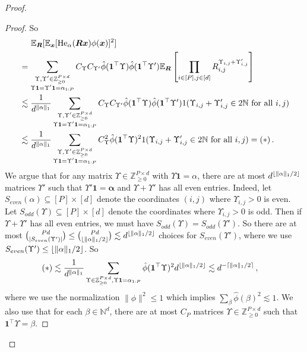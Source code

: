 \documentclass[11pt]{article}
\newcommand{\E}{\mathbb{E}}
\newcommand{\Z}{\mathbb{Z}}
\newcommand{\N}{\mathbb{N}}
\newcommand{\<}{\langle}
\renewcommand{\>}{\rangle}
\theoremstyle{definition}
\def\bR{{\boldsymbol R}}
\def\bx{{\boldsymbol x}}
\def\He{{\rm He}}
\def\bx{{\boldsymbol x}}
\def\He{{\rm He}}
\def\bR{{\boldsymbol R}}
\def\bones{{\boldsymbol 1}}
\DeclarePairedDelimiter{\ceil}{\lceil}{\rceil}
\DeclarePairedDelimiter{\floor}{\lfloor}{\rfloor}
\def\balpha{{\boldsymbol \alpha}}
\begin{document}
\begin{proof}
\begin{proof}
So
\begin{align*}
& \;\;\;\;\; \E_{\bR}[\E_{\bx}[\He_{\alpha}(\bR\bx) \phi(\bx)]^2] \\
&= \sum_{\substack{\Upsilon,\Upsilon' \in \Z_{\geq 0}^{P \times d} \\ \Upsilon \bones = \Upsilon' \bones = \alpha_{1:P}}} C_{\Upsilon} C_{\Upsilon'} \hat{\phi}(\bones^{\top} \Upsilon) \hat{\phi}(\bones^{\top} \Upsilon') \E_{\bR}\left[ \prod_{i \in [P],j \in [d]} R_{i,j}^{\Upsilon_{i,j} + \Upsilon'_{i,j}}\right] \\
&\lesssim \frac{1}{d^{\|\alpha\|_1}} \sum_{\substack{\Upsilon,\Upsilon' \in \Z_{\geq 0}^{P \times d} \\ \Upsilon \bones = \Upsilon' \bones = \alpha_{1:P}}} C_{\Upsilon} C_{\Upsilon'} \hat{\phi}(\bones^{\top} \Upsilon) \hat{\phi}(\bones^{\top} \Upsilon') 1(\Upsilon_{i,j} + \Upsilon'_{i,j} \in 2\N \mbox{ for all } i, j) \\
&\lesssim \frac{1}{d^{\|\alpha\|_1}} \sum_{\substack{\Upsilon,\Upsilon' \in \Z_{\geq 0}^{P \times d} \\ \Upsilon \bones = \Upsilon' \bones = \alpha_{1:P}}} C_{\Upsilon}^2 \hat{\phi}(\bones^{\top} \Upsilon)^2 1(\Upsilon_{i,j} + \Upsilon'_{i,j} \in 2\N \mbox{ for all } i, j) = (\ast)\,.
\end{align*}
We argue that for any matrix $\Upsilon \in \Z_{\geq 0}^{P \times d}$ with $\Upsilon \bones = \alpha$, there are at most $d^{\floor{\|\alpha\|_1/2}}$ matrices $\Upsilon'$ such that $\Upsilon' \bones = \balpha$ and $\Upsilon + \Upsilon'$ has all even entries. Indeed, let $S_{even}(\alpha) \subseteq [P] \times [d]$ denote the coordinates $(i,j)$ where $\Upsilon_{i,j} > 0$ is even. Let $S_{odd}(\Upsilon) \subseteq [P] \times [d]$ denote the coordinates where $\Upsilon_{i,j} > 0$ is odd. Then if $\Upsilon + \Upsilon'$ has all even entries, we must have $S_{odd}(\Upsilon) = S_{odd}(\Upsilon')$. So there are at most $\binom{Pd}{|S_{even}(\Upsilon')|} \leq \binom{Pd}{\floor{\|\alpha\|_1/2}} \lesssim d^{\floor{\|\alpha\|_1 / 2}}$ choices for $S_{even}(\Upsilon')$, where we use $S_{even}(\Upsilon') \leq \floor{\|\alpha\|_1 / 2}$. So
\begin{align*}
(\ast) &\lesssim \frac{1}{d^{\|\alpha\|_1}} \sum_{\Upsilon \in \Z^{P \times d}_{\geq 0}, \Upsilon \bones = \alpha_{1:P}} \hat{\phi}(\bones^\top \Upsilon)^2 d^{\floor{\|\alpha\|_1 / 2}} \lesssim d^{-\ceil{\|\alpha\|_1 / 2}}\,,
\end{align*}
where we use the normalization  $\|\phi\|^2 \leq 1$ which implies $\sum_{\beta} \hat{\phi}(\beta)^2 \lesssim 1$. We also use that for each $\beta \in \N^d$, there are at most $C_P$ matrices $\Upsilon \in \Z_{\geq 0}^{P \times d}$ such that $\bones^{\top} \Upsilon = \beta$.
\end{proof}
\end{proof}
\end{document}
